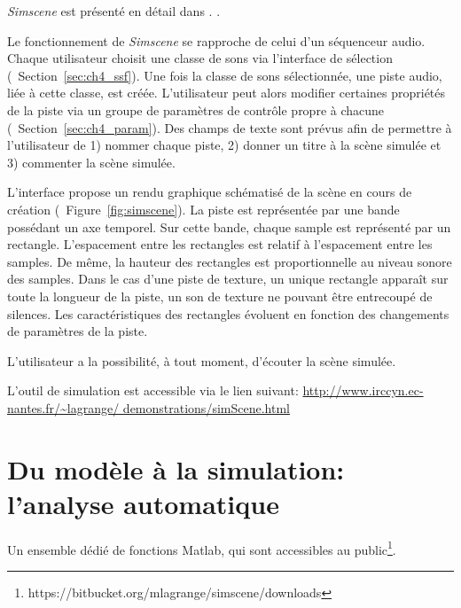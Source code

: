 \emph{Simscene} est présenté en détail dans \citep{rossignol2015simscene}. . 

Le fonctionnement de \emph{Simscene} se rapproche de celui d'un séquenceur audio. Chaque utilisateur choisit une classe de sons via l'interface de sélection (\cf~Section~\ref{sec:ch4_ssf}). Une fois la classe de sons sélectionnée, une piste audio, liée à cette classe, est créée. L'utilisateur peut alors modifier certaines propriétés de la piste via un groupe de paramètres de contrôle propre à chacune (\cf~Section~\ref{sec:ch4_param}). Des champs de texte sont prévus afin de permettre à l'utilisateur de 1) nommer chaque piste, 2) donner un titre à la scène simulée et 3) commenter la scène simulée.

L'interface propose un rendu graphique schématisé de la scène en cours de création (\cf~Figure~\ref{fig:simscene}). La piste est représentée par une bande possédant un axe temporel. Sur cette bande, chaque sample est représenté par un rectangle. L'espacement entre les rectangles est relatif à l'espacement entre les samples. De même, la hauteur des rectangles est proportionnelle au niveau sonore des samples. Dans le cas d'une piste de texture, un unique rectangle apparaît sur toute la longueur de la piste, un son de texture ne pouvant être entrecoupé de silences. Les caractéristiques des rectangles évoluent en fonction des changements de paramètres de la piste.

L'utilisateur a la possibilité, à tout moment, d'écouter la scène simulée.

L'outil de simulation est accessible via le lien suivant: \url{http://www.irccyn.ec-nantes.fr/~lagrange/
demonstrations/simScene.html}

\section{Du modèle à la simulation: l'analyse automatique}
\label{sec:ch4_modAnaAuto}

Un ensemble dédié de fonctions Matlab, qui sont accessibles au public\footnote{https://bitbucket.org/mlagrange/simscene/downloads}.

